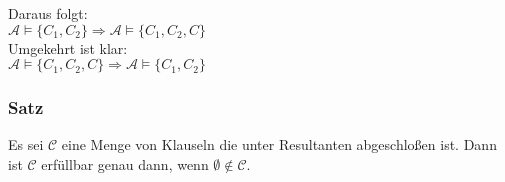 \documentclass[a4paper]{scrartcl}
\begin{document}
Daraus folgt: \\ 
\colorbox{light-gray}{$\mathcal{A} \models \{C_{1},C_{2}\} \Rightarrow \mathcal{A} \models \{C_{1},C_{2}, C\} $} \medskip\\
Umgekehrt ist klar: \\ 
\colorbox{light-gray}{$\mathcal{A} \models \{C_{1},C_{2}, C\} \Rightarrow \mathcal{A} \models \{C_{1},C_{2}\} $} \\

\subsubsection{Satz} Es sei $\mathcal{C}$ eine Menge von Klauseln die unter Resultanten abgeschloßen ist.
Dann ist $\mathcal{C}$ erfüllbar genau dann, wenn $\emptyset \notin \mathcal{C}$.\\
\end{document}
